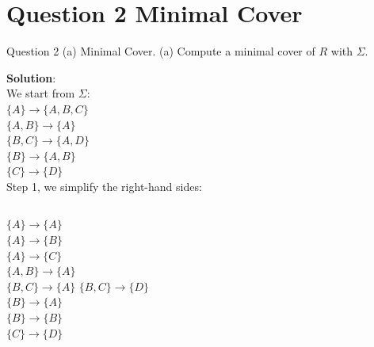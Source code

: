 \section*{Question 2 Minimal Cover}

\begin{frame}[fragile]{Question 2 (a) Minimal Cover.}
	(a) Compute a minimal cover of $R$ with $\Sigma$.\vspace{10pt}

	\textbf{Solution}: \\\vspace{3pt}
	We start from $\Sigma$: \\\vspace{5pt}
	$\{A\} \rightarrow \{A, B, C\}$\\
	$\{A, B\} \rightarrow \{A\}$\\
	$\{B, C\} \rightarrow \{A, D\}$\\
	$\{B\} \rightarrow \{A, B\}$\\
	$\{C\} \rightarrow \{D\}$\\\vspace{5pt}
	Step 1, we simplify the right-hand sides:\\\vspace{3pt}
	\begin{columns}[t]
	$\{A\} \rightarrow \{A\}$\\
	$\{A\} \rightarrow \{B\}$\\
	$\{A\} \rightarrow \{C\}$\\
	$\{A, B\} \rightarrow \{A\}$\\
	$\{B, C\} \rightarrow \{A\}$
	$\{B, C\} \rightarrow \{D\}$\\
	$\{B\} \rightarrow \{A\}$\\
	$\{B\} \rightarrow \{B\}$\\
	$\{C\} \rightarrow \{D\}$
	\end{columns}
\end{frame}

